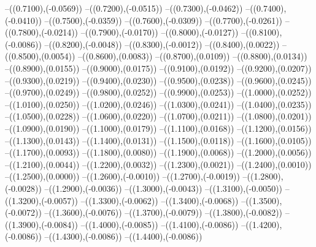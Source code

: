 {	--({\sx*(0.7100)},{\sy*(-0.0569)})
	--({\sx*(0.7200)},{\sy*(-0.0515)})
	--({\sx*(0.7300)},{\sy*(-0.0462)})
	--({\sx*(0.7400)},{\sy*(-0.0410)})
	--({\sx*(0.7500)},{\sy*(-0.0359)})
	--({\sx*(0.7600)},{\sy*(-0.0309)})
	--({\sx*(0.7700)},{\sy*(-0.0261)})
	--({\sx*(0.7800)},{\sy*(-0.0214)})
	--({\sx*(0.7900)},{\sy*(-0.0170)})
	--({\sx*(0.8000)},{\sy*(-0.0127)})
	--({\sx*(0.8100)},{\sy*(-0.0086)})
	--({\sx*(0.8200)},{\sy*(-0.0048)})
	--({\sx*(0.8300)},{\sy*(-0.0012)})
	--({\sx*(0.8400)},{\sy*(0.0022)})
	--({\sx*(0.8500)},{\sy*(0.0054)})
	--({\sx*(0.8600)},{\sy*(0.0083)})
	--({\sx*(0.8700)},{\sy*(0.0109)})
	--({\sx*(0.8800)},{\sy*(0.0134)})
	--({\sx*(0.8900)},{\sy*(0.0155)})
	--({\sx*(0.9000)},{\sy*(0.0175)})
	--({\sx*(0.9100)},{\sy*(0.0192)})
	--({\sx*(0.9200)},{\sy*(0.0207)})
	--({\sx*(0.9300)},{\sy*(0.0219)})
	--({\sx*(0.9400)},{\sy*(0.0230)})
	--({\sx*(0.9500)},{\sy*(0.0238)})
	--({\sx*(0.9600)},{\sy*(0.0245)})
	--({\sx*(0.9700)},{\sy*(0.0249)})
	--({\sx*(0.9800)},{\sy*(0.0252)})
	--({\sx*(0.9900)},{\sy*(0.0253)})
	--({\sx*(1.0000)},{\sy*(0.0252)})
	--({\sx*(1.0100)},{\sy*(0.0250)})
	--({\sx*(1.0200)},{\sy*(0.0246)})
	--({\sx*(1.0300)},{\sy*(0.0241)})
	--({\sx*(1.0400)},{\sy*(0.0235)})
	--({\sx*(1.0500)},{\sy*(0.0228)})
	--({\sx*(1.0600)},{\sy*(0.0220)})
	--({\sx*(1.0700)},{\sy*(0.0211)})
	--({\sx*(1.0800)},{\sy*(0.0201)})
	--({\sx*(1.0900)},{\sy*(0.0190)})
	--({\sx*(1.1000)},{\sy*(0.0179)})
	--({\sx*(1.1100)},{\sy*(0.0168)})
	--({\sx*(1.1200)},{\sy*(0.0156)})
	--({\sx*(1.1300)},{\sy*(0.0143)})
	--({\sx*(1.1400)},{\sy*(0.0131)})
	--({\sx*(1.1500)},{\sy*(0.0118)})
	--({\sx*(1.1600)},{\sy*(0.0105)})
	--({\sx*(1.1700)},{\sy*(0.0093)})
	--({\sx*(1.1800)},{\sy*(0.0080)})
	--({\sx*(1.1900)},{\sy*(0.0068)})
	--({\sx*(1.2000)},{\sy*(0.0056)})
	--({\sx*(1.2100)},{\sy*(0.0044)})
	--({\sx*(1.2200)},{\sy*(0.0032)})
	--({\sx*(1.2300)},{\sy*(0.0021)})
	--({\sx*(1.2400)},{\sy*(0.0010)})
	--({\sx*(1.2500)},{\sy*(0.0000)})
	--({\sx*(1.2600)},{\sy*(-0.0010)})
	--({\sx*(1.2700)},{\sy*(-0.0019)})
	--({\sx*(1.2800)},{\sy*(-0.0028)})
	--({\sx*(1.2900)},{\sy*(-0.0036)})
	--({\sx*(1.3000)},{\sy*(-0.0043)})
	--({\sx*(1.3100)},{\sy*(-0.0050)})
	--({\sx*(1.3200)},{\sy*(-0.0057)})
	--({\sx*(1.3300)},{\sy*(-0.0062)})
	--({\sx*(1.3400)},{\sy*(-0.0068)})
	--({\sx*(1.3500)},{\sy*(-0.0072)})
	--({\sx*(1.3600)},{\sy*(-0.0076)})
	--({\sx*(1.3700)},{\sy*(-0.0079)})
	--({\sx*(1.3800)},{\sy*(-0.0082)})
	--({\sx*(1.3900)},{\sy*(-0.0084)})
	--({\sx*(1.4000)},{\sy*(-0.0085)})
	--({\sx*(1.4100)},{\sy*(-0.0086)})
	--({\sx*(1.4200)},{\sy*(-0.0086)})
	--({\sx*(1.4300)},{\sy*(-0.0086)})
	--({\sx*(1.4400)},{\sy*(-0.0086)})
}
